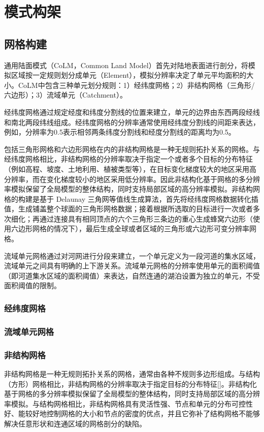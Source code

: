 \chapter{模式构架}\label{模式构架}
\section{网格构建}\label{网格构建}

通用陆面模式（CoLM，Common Land Model）首先对陆地表面进行剖分，将模拟区域按一定规则划分成单元（Element），模拟分辨率决定了单元平均面积的大小。CoLM中包含三种单元划分规则：1）经纬度网格；2）非结构网格（三角形/六边形）；3）流域单元（Catchment）。

经纬度网格通过规定经度和纬度分割线的位置来建立，单元的边界由东西两段经线和南北两段纬线组成。经纬度网格的分辨率通常使用经纬度分割线的间距来表达，例如，分辨率为0.5\textdegree 表示相邻两条纬度分割线和经度分割线的距离均为0.5\textdegree。


包括三角形网格和六边形网格在内的非结构网格是一种无规则拓扑关系的网格。与经纬度网格相比，非结构网格的分辨率取决于指定一个或者多个目标的分布特征（例如高程、坡度、土地利用、植被类型等），在目标变化梯度较大的地区采用高分辨率，而在变化梯度较小的地区采用低分辨率。因此非结构化基于网格的多分辨率模拟保留了全局模型的整体结构，同时支持局部区域的高分辨率模拟。非结构网格的构建是基于 Delaunay 三角网等值线生成算法，首先将经纬度网格数据转化插值，生成铺盖整个球面的三角形网格数据；接着根据所选取的目标进行一次或者多次细化；再通过连接具有相同顶点的六个三角形三条边的重心生成蜂窝六边形（使用六边形网格的情况下），最后生成全球或者区域的三角形或六边形可变分辨率网格。

流域单元网格通过对河网进行分段来建立，一个单元定义为一段河道的集水区域，流域单元之间具有明确的上下游关系。流域单元网格的分辨率使用单元的面积阈值（即河道集水区域的面积阈值）来表达，自然连通的湖泊设置为独立的单元，不受面积阈值的限制。
\subsection{经纬度网格}\label{经纬度网格}

\subsection{流域单元网格}\label{流域单元网格}

\subsection{非结构网格}\label{非结构网格}
非结构网格是一种无规则拓扑关系的网格，通常由各种不规则多边形组成。与结构（方形）网格相比，非结构网格的分辨率取决于指定目标的分布特征[]。非结构化基于网格的多分辨率模拟保留了全局模型的整体结构，同时支持局部区域的高分辨率模拟。与结构网格相比，非结构网格具有灵活性强、节点和单元的分布可控性好、能较好地控制网格的大小和节点的密度的优点，并且它弥补了结构网格不能够解决任意形状和连通区域的网格剖分的缺陷。

